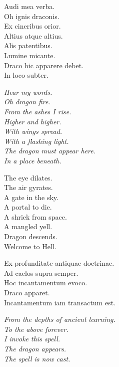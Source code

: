 
Audi mea verba. \\
Oh ignis draconis. \\
Ex cineribus orior. \\
Altius atque altius. \\
Alis patentibus. \\
Lumine micante. \\
Draco hic apparere debet. \\
In loco subter. \\


{\itshape%
	Hear my words. \\
	Oh dragon fire. \\
	From the ashes I rise. \\
	Higher and higher. \\
	With wings spread. \\
	With a flashing light. \\
	The dragon must appear here. \\
	In a place beneath. \\
}


The eye dilates. \\
The air gyrates. \\
A gate in the sky. \\
A portal to die. \\
A shriek from space. \\
A mangled yell. \\
Dragon descends. \\
Welcome to Hell. \\


Ex profunditate antiquae doctrinae. \\
Ad caelos supra semper. \\
Hoc incantamentum evoco. \\
Draco apparet. \\
Incantamentum iam transactum est. \\


{\itshape%
	From the depths of ancient learning. \\
	To the  above forever. \\
	I invoke this spell. \\
	The dragon appears. \\
	The spell is now cast. \\
}

